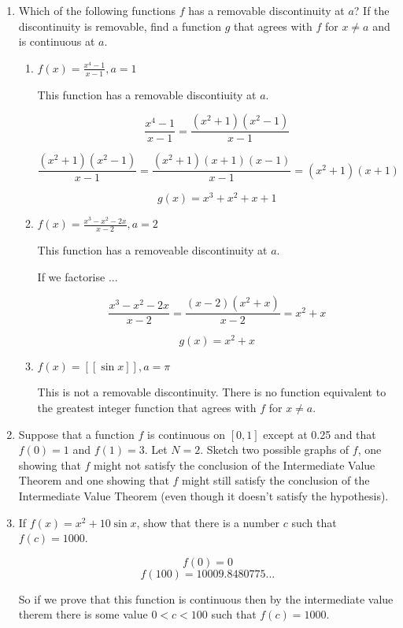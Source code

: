 \documentclass{article}
\begin{document}
\begin{enumerate}
			\item Which of the following functions $f$ has a removable discontinuity at $a$?
				If the discontinuity is removable, find a function $g$ that agrees with $f$
				for $x \neq a$ and is continuous at $a$.

			\begin{enumerate}
				\item $f(x) = \frac{x^4 - 1}{x-1}, a = 1$
				
				This function has a removable discontiuity at $a$.

				$$\frac{x^4 - 1}{x-1} = \frac{(x^2 + 1)(x^2 - 1)}{x-1}$$

				$$\frac{(x^2+1)(x^2-1)}{x-1} = \frac{(x^2+1)(x+1)(x-1)}{x-1} = (x^2+1)(x+1)$$

				$$g(x) = x^3 + x^2 + x + 1$$ 

				\item $f(x) = \frac{x^3 - x^2 - 2x}{x-2}, a = 2$

				This function has a removeable discontinuity at $a$.

				If we factorise ...

				$$\frac{x^3 - x^2 - 2x}{x-2} = \frac{(x-2)(x^2 + x)}{x-2} = x^2 + x$$

				$$g(x) = x^2 + x$$	

				\item $f(x) = [[\sin x]], a = \pi$

				This is not a removable discontinuity. There is no function equivalent
				to the greatest integer function that agrees with $f$ for $x \neq a$.	
			\end{enumerate}

			\item Suppose that a function $f$ is continuous on $[0, 1]$ except at 0.25
				and that $f(0) = 1$ and $f(1) = 3$. Let $N = 2$. Sketch two possible
				graphs of $f$, one showing that $f$ might not satisfy the conclusion
				of the Intermediate Value Theorem and one showing that $f$ might still
				satisfy the conclusion of the Intermediate Value Theorem (even though
				it doesn't satisfy the hypothesis).


			\item If $f(x) = x^2 + 10 \sin x$, show that there is a number $c$ such that
				$f(c) = 1000$.

			$$f(0) = 0$$
			$$f(100) = 10009.8480775...$$

			So if we prove that this function is continuous then by the intermediate value
			therem there is some value $0 < c < 100$ such that $f(c) = 1000$.


\end{enumerate}
\end{document}
